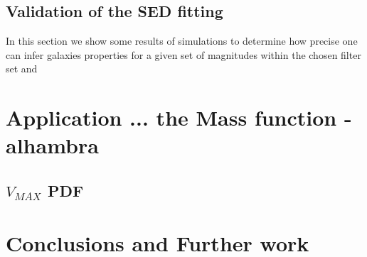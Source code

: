 \documentclass[9pt]{memoir}
\begin{document}
\section{Validation of the SED fitting}

In this section we show some results of simulations to determine how precise one can infer galaxies properties for a given set of magnitudes within the chosen filter set and 





\chapter{Application ... the Mass function - alhambra}


\section{$V_{MAX}$ PDF}
\label{sec:vmax}



\chapter{Conclusions and Further work}




\end{document}
